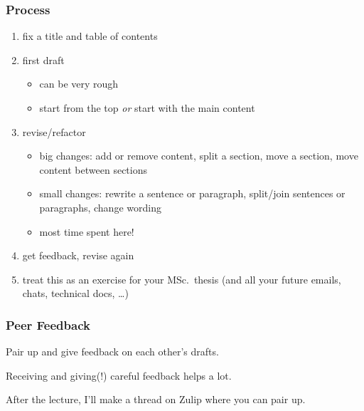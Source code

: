 \begin{frame}
  \frametitle{Process}

  \begin{enumerate}[<+->]
    \item fix a title and table of contents
    \item first draft
          \begin{itemize}
            \item can be very rough
            \item start from the top \emph{or} start with the main content
          \end{itemize}
    \item revise/refactor
          \begin{itemize}
            \item big changes: add or remove content, split a section, move a section, move content between sections
            \item small changes: rewrite a sentence or paragraph, split/join sentences or paragraphs, change wording
            \item most time spent here!
          \end{itemize}
    \item get feedback, revise again
    \item treat this as an exercise for your MSc.\ thesis (and all your future emails, chats, technical docs, \dots)
  \end{enumerate}
\end{frame}

\begin{frame}
  \frametitle{Peer Feedback}

  Pair up and give feedback on each other's drafts.

  \medskip
  \pause

  Receiving and giving(!) careful feedback helps a lot.

  \medskip
  \pause

  After the lecture, I'll make a thread on Zulip where you can pair up.
\end{frame}

